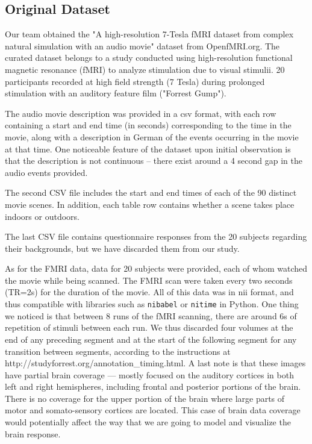 
\subsection{Original Dataset}
\par Our team obtained the "A high-resolution 7-Tesla fMRI dataset from complex natural simulation with an audio movie" dataset from OpenfMRI.org. The curated dataset belongs to a study conducted using high-resolution functional magnetic resonance (fMRI) to analyze stimulation due to visual stimulii. 20 participants recorded at high field strength (7 Tesla) during prolonged stimulation with an auditory feature film ("Forrest Gump"). 

\par The audio movie description was provided in a csv format, with each row containing a start and end time (in seconds) corresponding to the time in the movie, along with a description in German of the events occurring in the movie at that time. One noticeable feature of the dataset upon initial observation is that the description is not continuous -- there exist around a 4 second gap in the audio events provided. 

\par The second CSV file includes the start and end times of each of the 90 distinct movie scenes. In addition, each table row contains whether a scene takes place indoors or outdoors. 

\par The last CSV file contains questionnaire responses from the 20 subjects regarding their backgrounds,  but we have discarded them from our study. 

\par As for the FMRI data, data for 20 subjects were provided, each of whom watched the movie while being scanned. The FMRI scan were taken every two seconds (TR=2s) for the duration of the movie. All of this data was in nii format, and thus compatible with libraries such as \texttt{nibabel} or \texttt{nitime} in Python. One thing we noticed is that between 8 runs of the fMRI scanning, there are around 6s of repetition of stimuli between each run. We thus discarded four volumes at the end of any preceding segment and at the start of the following segment for any transition between segments, according to the instructions at http://studyforrest.org/annotation\_timing.html. A last note is that these images have partial brain coverage — mostly focused on the auditory cortices in both left and right hemispheres, including frontal and posterior portions of the brain. There is no coverage for the upper portion of the brain where large parts of motor and somato-sensory cortices are located. This case of brain data coverage would potentially affect the way that we are going to model and visualize the brain response.


